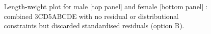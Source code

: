 \begin{figure}[htp]
\captionsetup[subfigure]{labelformat=empty}
\begin{center}
\newline
{}
\end{center}
\caption{Length-weight plot for male [top panel] and female [bottom panel] \fishname: combined 3CD5ABCDE with no residual or distributional constraints but discarded standardised residuals (option B).}
\label{fig:lwOptionB}
\end{figure}

